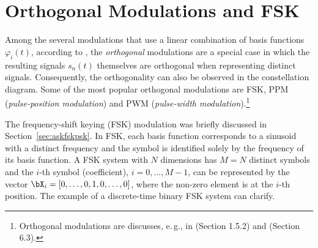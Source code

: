 \section{Orthogonal Modulations and FSK}
\label{sec:fskOrthogonalModulation}

Among the several modulations that use a linear combination of basis functions $\varphi_i(t)$, according to , the \emph{orthogonal} modulations are a special case in which the resulting signals $s_n(t)$ themselves are
orthogonal when representing distinct signals. Consequently, the orthogonality can also be observed
in the constellation diagram. Some of the most popular orthogonal modulations are
FSK, PPM (\emph{pulse-position modulation}) and PWM (\emph{pulse-width modulation}).\footnote{Orthogonal modulations are discusses, e.\,g., in \cite{Ciofficn} (Section 1.5.2) and \cite{Barry04} (Section 6.3).}

The frequency-shift keying (FSK) modulation was briefly discussed in Section~\ref{sec:askfskpsk}. In FSK, each basis function corresponds to a sinusoid with a distinct frequency and the symbol is identified solely by the frequency of its basis function. A FSK system with $N$ dimensions has $M=N$ distinct symbols and the $i$-th symbol (coefficient), $i=0,\ldots,M-1$, can be represented by the vector $\bX_i = [0,\ldots,0,1,0,\ldots,0]$, where the non-zero element is at the $i$-th position. The example of a discrete-time binary FSK system can clarify.

